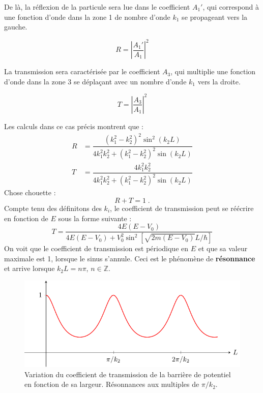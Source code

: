 \documentclass{book}
\begin{document}
De là, la réflexion de la particule sera lue dans le coefficient $A_1'$, qui correspond à une fonction d'onde dans la zone 1 de nombre d'onde $k_1$ se propageant vers la gauche.

$$ R = \left|\dfrac{A_1'}{A_1}\right|^2$$

La transmission sera caractérisée par le coefficient $A_3$, qui multiplie une fonction d'onde dans la zone 3 se déplaçant avec un nombre d'onde $k_1$ vers la droite.

$$ T = \left|\dfrac{A_3}{A_1}\right|^2$$

Les calculs dans ce cas précis montrent que :
\begin{align}
  R &= \dfrac{(k_1 ^2 - k_2 ^ 2) ^2 \sin^2(k_2 L)}{4k_1 ^2 k_2 ^2 + (k_1 ^2 - k_2 ^ 2) ^2\sin(k_2L)} \\
  T &= \dfrac{4k_1 ^2 k_2 ^2}{4k_1 ^2 k_2 ^2 + (k_1 ^2 - k_2 ^ 2) ^2\sin(k_2L)} 
\end{align}
Chose chouette : 
$$ R + T = 1 \; .$$
Compte tenu des définitons des $k_i$, le coefficient de transmission peut se réécrire en fonction de $E$ sous la forme suivante :
\begin{equation}
  T = \dfrac{4E (E-V_0)}{4E(E-V_0) + V_0 ^2 \sin ^ 2\left[\sqrt{2m(E-V_0)} L/\hbar\right]}
\end{equation}
On voit que le coefficient de transmission est périodique en $E$ et que sa valeur maximale est 1, lorsque le sinus s'annule. Ceci est le phénomène de \textbf{résonnance} et arrive lorsque $k_2L = n\pi$, $n\in \mathbb{Z}$.

\begin{figure}[h]
  \centering
  \includegraphics{images/marche_potentiel_transmission.pdf}
  \caption{Variation du coefficient de transmission de la barrière de potentiel en fonction de sa largeur. Résonnances aux multiples de $\pi/k_2$.}
\end{figure}
\end{document}

